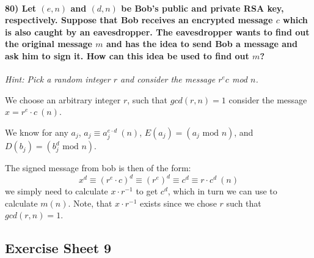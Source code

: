 \documentclass[
]{article}
\begin{document}
\hypertarget{let-en-and-dn-be-bobs-public-and-private-rsa-key-respectively.-suppose-that-bob-receives-an-encrypted-message-c-which-is-also-caught-by-an-eavesdropper.-the-eavesdropper-wants-to-find-out-the-original-message-m-and-has-the-idea-to-send-bob-a-message-and-ask-him-to-sign-it.-how-can-this-idea-be-used-to-find-out-m}{%
\paragraph{\texorpdfstring{80) Let \((e,n)\) and \((d,n)\) be Bob's
public and private RSA key, respectively. Suppose that Bob receives an
encrypted message \(c\) which is also caught by an eavesdropper. The
eavesdropper wants to find out the original message \(m\) and has the
idea to send Bob a message and ask him to sign it. How can this idea be
used to find out
\(m\)?}{80) Let (e,n) and (d,n) be Bob's public and private RSA key, respectively. Suppose that Bob receives an encrypted message c which is also caught by an eavesdropper. The eavesdropper wants to find out the original message m and has the idea to send Bob a message and ask him to sign it. How can this idea be used to find out m?}}\label{let-en-and-dn-be-bobs-public-and-private-rsa-key-respectively.-suppose-that-bob-receives-an-encrypted-message-c-which-is-also-caught-by-an-eavesdropper.-the-eavesdropper-wants-to-find-out-the-original-message-m-and-has-the-idea-to-send-bob-a-message-and-ask-him-to-sign-it.-how-can-this-idea-be-used-to-find-out-m}}

\emph{Hint: Pick a random integer \(r\) and consider the message
\(r^{e}c\) mod \(n\).}

We choose an arbitrary integer \(r\), such that \(gcd(r,n) = 1\)
consider the message \(x = r^{e} \cdot c \ (n)\).

We know for any \(a_j\), \(a_j \equiv a_j^{e \cdot d} \ (n)\),
\(E(a_j) = (a_j \text{ mod } n)\), and
\(D(b_j) = (b_j^d \text{ mod } n)\).

The signed message from bob is then of the form: \[
x^d \equiv (r^{e} \cdot c)^d \equiv (r^{e})^d \equiv c^d \equiv r \cdot c^d \ (n)
\] we simply need to calculate \(x \cdot r^{-1}\) to get \(c^d\), which
in turn we can use to calculate \(m(n)\). Note, that \(x \cdot r^{-1}\)
exists since we chose \(r\) such that \(gcd(r,n) = 1\).

\hypertarget{exercise-sheet-9}{%
\subsection{Exercise Sheet 9}\label{exercise-sheet-9}}
\end{document}
